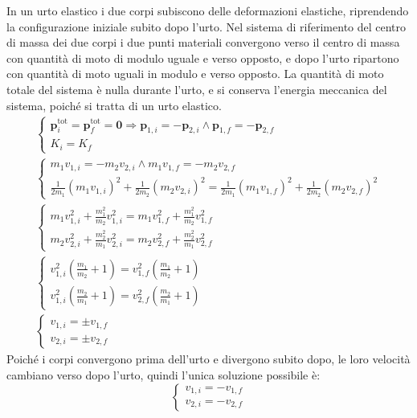 \documentclass{article}
\newcommand{\vect}[1]{\boldsymbol{\mathbf{#1}}}
\numberwithin{equation}{subsection}
\begin{document}
In un urto elastico i due corpi subiscono delle deformazioni elastiche, riprendendo la configurazione iniziale subito dopo l'urto. 
Nel sistema di riferimento del 
centro di massa dei due corpi i due punti materiali convergono verso il centro di massa con quantità di moto di modulo uguale e verso opposto, e dopo l'urto ripartono con 
quantità di moto uguali in modulo e verso opposto. La quantità di moto 
totale del sistema è nulla durante l'urto, e si conserva l'energia meccanica del sistema, poiché si tratta di un urto elastico. 
\begin{gather*}
    \begin{cases}
        \vect{p}^\mathrm{tot}_i=\vect{p}^\mathrm{tot}_f=\vect{0}\Rightarrow \vect{p}_{1,i}=-\vect{p}_{2,i}\land\vect{p}_{1,f}=-\vect{p}_{2,f}\\
        K_i=K_f
    \end{cases}\\
    \begin{cases}
        m_1v_{1,i}=-m_2v_{2,i}\land m_1v_{1,f}=-m_2v_{2,f}\\
        \displaystyle\frac{1}{2m_1}(m_1v_{1,i})^2+\frac{1}{2m_2}(m_2v_{2,i})^2=\frac{1}{2m_1}(m_1v_{1,f})^2+\frac{1}{2m_2}(m_2v_{2,f})^2
    \end{cases}\\
    \begin{cases}
        \displaystyle m_1v_{1,i}^2+\frac{m_1^2}{m_2}v_{1,i}^2=m_1v_{1,f}^2+\frac{m_1^2}{m_2}v_{1,f}^2\\
        \displaystyle m_2v_{2,i}^2+\frac{m_2^2}{m_1}v_{2,i}^2=m_2v_{2,f}^2+\frac{m_2^2}{m_1}v_{2,f}^2
    \end{cases}\\
    \begin{cases}
        \displaystyle v_{1,i}^2\left(\displaystyle\frac{m_1}{m_2}+1\right)=v_{1,f}^2\left(\displaystyle\frac{m_1}{m_2}+1\right)\\
        \displaystyle v_{1,i}^2\left(\displaystyle\frac{m_2}{m_1}+1\right)=v_{2,f}^2\left(\displaystyle\frac{m_2}{m_1}+1\right)
    \end{cases}\\
    \begin{cases}
        v_{1,i}=\pm v_{1,f}\\
        v_{2,i}=\pm v_{2,f}
    \end{cases}     
\end{gather*}
Poiché i corpi convergono prima dell'urto e divergono subito 
dopo, le loro velocità cambiano verso dopo l'urto, quindi 
l'unica soluzione possibile è:
\begin{equation}
    \begin{cases}
        v_{1,i}=-v_{1,f}\\
        v_{2,i}=-v_{2,f}
    \end{cases}
\end{equation}
\end{document}
